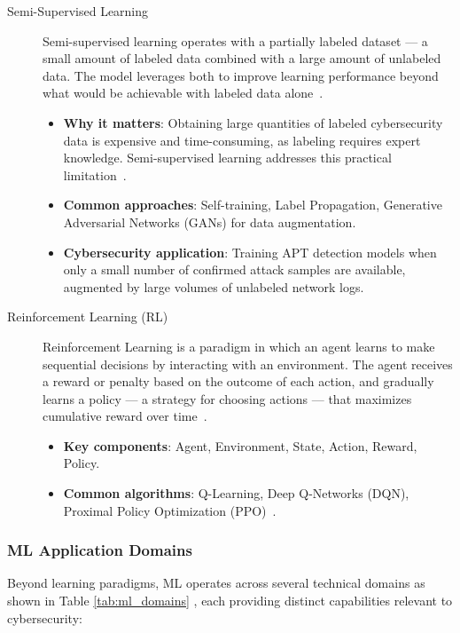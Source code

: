 \begin{description}
    \item[Semi-Supervised Learning] Semi-supervised learning operates with a partially labeled dataset --- a small amount of labeled data combined with a large amount of unlabeled data. The model leverages both to improve learning performance beyond what would be achievable with labeled data alone~\cite{zhu2005semisupervised}.
    \begin{itemize}
        \item \textbf{Why it matters}: Obtaining large quantities of labeled cybersecurity data is expensive and time-consuming, as labeling requires expert knowledge. Semi-supervised learning addresses this practical limitation~\cite{zhu2005semisupervised}.
        \item \textbf{Common approaches}: Self-training, Label Propagation, Generative Adversarial Networks (GANs) for data augmentation.
        \item \textbf{Cybersecurity application}: Training APT detection models when only a small number of confirmed attack samples are available, augmented by large volumes of unlabeled network logs.
    \end{itemize}
    

    \item[Reinforcement Learning (RL)] Reinforcement Learning is a paradigm in which an agent learns to make sequential decisions by interacting with an environment. The agent receives a reward or penalty based on the outcome of each action, and gradually learns a policy --- a strategy for choosing actions --- that maximizes cumulative reward over time~\cite{sutton2018reinforcement}.
    \begin{itemize}
        \item \textbf{Key components}: Agent, Environment, State, Action, Reward, Policy.
        \item \textbf{Common algorithms}: Q-Learning, Deep Q-Networks (DQN), Proximal Policy Optimization (PPO)~\cite{sutton2018reinforcement}.
    \end{itemize}
    
\end{description}

\subsubsection*{ML Application Domains}

Beyond learning paradigms, ML operates across several technical domains as shown in Table \ref{tab:ml_domains}  , each providing distinct capabilities relevant to cybersecurity:

